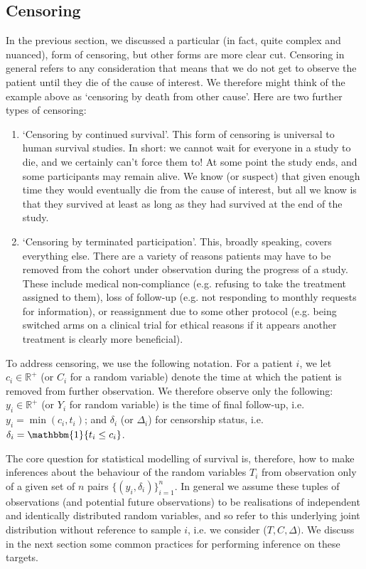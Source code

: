 \documentclass[../thesis.tex]{subfiles}
\begin{document}
\subsection{Censoring}
In the previous section, we discussed a particular (in fact, quite complex and nuanced), form of censoring, but other forms are more clear cut. Censoring in general refers to any consideration that means that we do not get to observe the patient until they die of the cause of interest. We therefore might think of the example above as `censoring by death from other cause'. Here are two further types of censoring:

\begin{enumerate}
    \item `Censoring by continued survival'. This form of censoring is universal to human survival studies. In short: we cannot wait for everyone in a study to die, and we certainly can't force them to! At some point the study ends, and some participants may remain alive. We know (or suspect) that given enough time they would eventually die from the cause of interest, but all we know is that they survived at least as long as they had survived at the end of the study.
    \item `Censoring by terminated participation'. This, broadly speaking, covers everything else. There are a variety of reasons patients may have to be removed from the cohort under observation during the progress of a study. These include medical non-compliance (e.g. refusing to take the treatment assigned to them), loss of follow-up (e.g. not responding to monthly requests for information), or reassignment due to some other protocol (e.g. being switched arms on a clinical trial for ethical reasons if it appears another treatment is clearly more beneficial).
\end{enumerate}

To address censoring, we use the following notation. For a patient $i$, we let $c_i \in \mathbb{R}^{+}$ (or $C_i$ for a random variable) denote the time at which the patient is removed from further observation. We therefore observe only the following: $y_i \in \mathbb{R}^{+}$ (or $Y_i$ for random variable) is the time of final follow-up, i.e. $y_i = \min(c_i, t_i)$; and $\delta_i$ (or $\Delta_i$) for censorship status, i.e. $\delta_i = \mathbbm{1}\{t_i \leq c_i\}$. 

The core question for statistical modelling of survival is, therefore, how to make inferences about the behaviour of the random variables $T_i$ from observation only of a given set of $n$ pairs $\{(y_i, \delta_i)\}_{i=1}^{n}$. In general we assume these tuples of observations (and potential future observations) to be realisations of independent and identically distributed random variables, and so refer to this underlying joint distribution without reference to sample $i$, i.e. we consider ($T, C, \Delta)$.  We discuss in the next section some common practices for performing inference on these targets.
   
\end{document}
